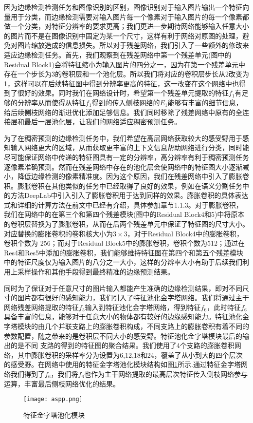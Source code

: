 \documentclass[master]{thesis-uestc}
\begin{document}
因为边缘检测检测任务和图像识别的区别，图像识别对于输入图片输出一个特征向量用于分类，而边缘检测需要对输入图片每一个像素对于输入图片的每一个像素都做一个分类，对特征分辨率的要求更高；我们更进一步期待网络能够输入任意大小的图片而不是在图像识别中固定为某一个尺寸，这样有利于网络对原图的处理，避免对图片缩放造成的信息损失。所以对于残差网络，我们引入了一些额外的修改来适应边缘检测任务。首先，我们观察到在残差网络中第一个残差单元(图中的Residual Block1)会将特征缩小为输入图片的四分之一，因为在第一个残差单元中存在一个步长为3的卷积层和一个池化层。所以我们将对应的卷积层步长从2改变为1，这样可以在后续特征图中得到分辨率更高的特征，这一改变在这个网络中也得到了很好的效果。同时我们在网络设计时，希望第一个残差单元提取的特征$f_1$有足够的分辨率从而使得从特征$f_1$得到的传入侧枝网络的$E_1$能够有丰富的细节信息，给后续侧枝网络的渐进优化添加足够信息。我们同时移除了残差网络中原有的全连接层和最后一层池化层，让我们的网络适应稠密预测任务。

为了在稠密预测的边缘检测任务中，我们希望在高层网络获取较大的感受野用于感知输入网络更大的区域，从而获取更丰富的上下文信息帮助网络进行分类，同时能尽可能保证网络中传递的特征图具有一定的分辨率，高分辨率有利于稠密预测任务逐像素准确预测。然而在残差网络中存在的池化层会使网络中的特征图大小逐渐减小，降低边缘检测的像素精准度。因为这个原因，我们在残差网络中引入了膨胀卷积。膨胀卷积在其他类似的任务中已经取得了良好的效果，例如在语义分割任务中的方法DeepLab中引入引入了膨胀卷积用于达到同样的效果。膨胀卷积的具体表达式和详细的计算方法在前文中已经有介绍，具体参加章节1.1.3。对于膨胀卷积，我们在网络中的在第三个和第四个残差模块(图中的Residual  Block4和5)中将原本的卷积层替换为了膨胀卷积，从而在后两个残差单元中保证了特征图的尺寸大小。对应替换的膨胀卷积的卷积核大小为$3 \times 3$，对于Residual Block4中的膨胀卷积，卷积个数为 256；而对于Residual Block5中的膨胀卷积，卷积个数为512；通过在Res4和Res5中添加的膨胀卷积，我们能够维持特征图在第四个和第五个残差模块中的特征尺度仅为输入图片的八分之一大小，这样的分辨率大小有助于后续我们利用上采样操作和其他手段得到最终精准的边缘预测结果。

同时为了保证对于任意尺寸的图片输入都能产生准确的边缘检测结果，即对不同尺寸的图片都有很好的感知能力，我们引入了特征池化金字塔网络。我们将通过主干网络残差网络提取的特征$f_5$输入到特征池化金字塔网络，得到特征$f_6$，此时特征$f_6$具备丰富的信息，能够对于任意大小的物体都有较好的边缘感知能力。特征池化金字塔模块的由几个并联支路上的膨胀卷积构成，不同支路上的膨胀卷积有着不同的参数配置，随之带来的是卷积层不同大小的感受野。特征池化金字塔模块最后的输出的是不同 支路的得到的特征图的聚合结果。我们使用了4个支路的膨胀卷积网络，其中膨胀卷积的采样率分为设置为6,12,18和24，覆盖了从小到大的四个层次的感受野。在网络中使用的特征金字塔池化模块结构如图\ref{aspp}所示.通过特征金字塔网络我们得到了$f_6$，我们将$f_6$也作为主干网络提取的最高层次特征传入侧枝网络参与运算，丰富最后侧枝网络优化的结果。
\begin{figure}[h!]
    \texttt{[image: aspp.png]}
    \caption{特征金字塔池化模块}
    \label{aspp}
\end{figure}
\end{document}
